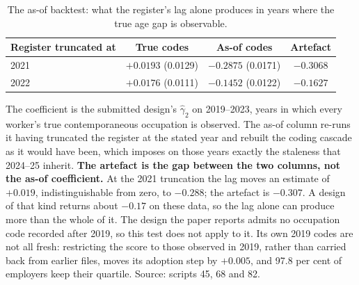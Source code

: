 \begin{table}[ht!]
\centering
\footnotesize
\caption{The as-of backtest: what the register's lag alone produces in years where the true age gap is observable.}
\label{tab:iv_backtest}
\begin{tabular}{lccc}
\toprule
Register truncated at & True codes & As-of codes & Artefact \\
\midrule
2021 & $+0.0193$ (0.0129) & $-0.2875$ (0.0171) & $\mathbf{-0.3068}$ \\
2022 & $+0.0176$ (0.0111) & $-0.1452$ (0.0122) & $\mathbf{-0.1627}$ \\
\bottomrule
\end{tabular}
\begin{minipage}{0.90\textwidth}\footnotesize\vspace{4pt}The coefficient is the submitted design's $\hat\gamma_2$ on 2019--2023, years in which every worker's true contemporaneous occupation is observed. The as-of column re-runs it having truncated the register at the stated year and rebuilt the coding cascade as it would have been, which imposes on those years exactly the staleness that 2024--25 inherit. \textbf{The artefact is the gap between the two columns, not the as-of coefficient.} At the 2021 truncation the lag moves an estimate of $+0.019$, indistinguishable from zero, to $-0.288$; the artefact is $-0.307$. A design of that kind returns about $-0.17$ on these data, so the lag alone can produce more than the whole of it. The design the paper reports admits no occupation code recorded after 2019, so this test does not apply to it. Its own 2019 codes are not all fresh: restricting the score to those observed in 2019, rather than carried back from earlier files, moves its adoption step by $+0.005$, and 97.8 per cent of employers keep their quartile. Source: scripts 45, 68 and 82.\end{minipage}
\end{table}
